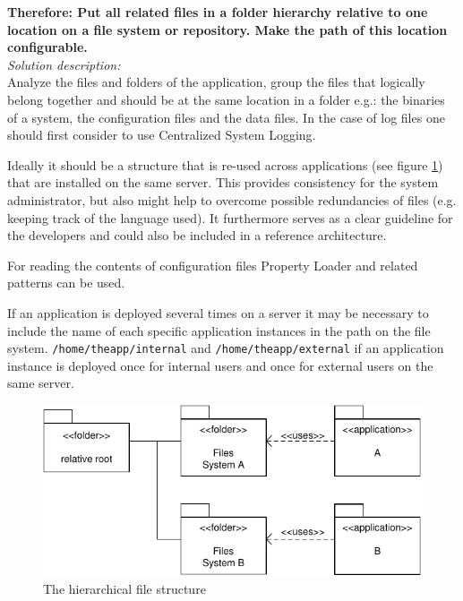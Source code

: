 \begin{center}
   
\end{center}

\textbf{Therefore: Put all related files in a folder hierarchy relative to one location on a file system or repository. Make the path of this location configurable.}\\

\textit{Solution description:}\\
Analyze the files and folders of the application, group the files  that logically belong together and should be at the same location in a folder e.g.: the binaries of a system, the configuration files and the data files. In the case of log files one should first consider to use {\sc Centralized System Logging}.

Ideally it should be a structure that is re-used across applications (see figure \ref{fig:singleFileLocationDiagram-01}) that are installed on the same server. This provides consistency for the system administrator, but also might help to overcome possible redundancies of files (e.g. keeping track of the language used). It furthermore serves as a clear guideline for the developers and could also be included in a reference architecture.

For reading the contents of configuration files {\sc Property Loader} and related patterns \cite{Wellhausen2010} can be used. 

If an application is deployed several times on a server it may be necessary to include the name of each specific application instances in the path on the file system. \verb|/home/theapp/internal| and \verb|/home/theapp/external| if an application instance is deployed once for internal users and once for external users on the same server.
\begin{figure}[h]
\centering
\includegraphics{patterns/singleFileLocationDiagram-01.pdf}
\caption{The hierarchical file structure}
\label{fig:singleFileLocationDiagram-01}
\end{figure}

